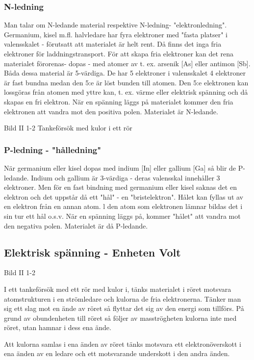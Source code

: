 \subsubsection{N-ledning}
Man talar om N-ledande material respektive
N-ledning- "elektronledning".
Germanium, kisel m.fl. halvledare har
fyra elektroner med "fasta platser" i valensskalet - förutsatt att materialet är helt
rent. Då finns det inga fria elektroner för
laddningstransport.
För att skapa fria elektroner kan det rena
materialet förorenas- dopas - med atomer
av t. ex. arsenik [As] eller antimon [Sb]. Båda
dessa material är 5-värdiga. De har 5 elektroner i valensskalet
4 elektroner är fast bundna medan den 5:e är
löst bunden till atomen. Den 5:e elektronen
kan lossgöras från atomen med yttre
kan, t. ex. värme eller elektrisk spänning och
då skapas en fri elektron. När en spänning
läggs på materialet kommer den fria elektronen att vandra mot den positiva polen. Materialet är N-ledande.

Bild II 1-2 Tankeförsök med kulor i ett rör

\subsubsection{P-ledning - "hålledning"}
När germanium eller kisel dopas med indium
[In] eller gallium [Ga] så blir de P-ledande.
Indium och gallium är 3-värdiga - deras
valensskal innehåller 3 elektroner. Men för
en fast bindning med germanium eller kisel
saknas det en elektron och det uppstår då ett
"hål" - en "bristelektron". Hålet kan fyllas ut
av en elektron från en annan atom. l den
atom som elektronen lämnar bildas det i sin
tur ett hål o.s.v. När en spänning läggs på,
kommer "hålet" att vandra mot den negativa
polen. Materialet är då P-ledande.

\subsection{Elektrisk spänning - Enheten Volt}
Bild II 1-2

I ett tankeförsök med ett rör med kulor i, tänks materialet i röret motsvara
atomstrukturen i en strömledare och kulorna de fria elektronerna. Tänker man sig ett slag
mot en ände av röret så flyttar det sig av den energi som tillförs. På grund av
obundenheten till röret så följer av masströgheten kulorna inte med röret, utan hamnar i dess ena ände.

Att kulorna samlas i ena änden av röret tänks motsvara ett elektronöverskott i ena
änden av en ledare och ett motsvarande underskott i den andra änden.

